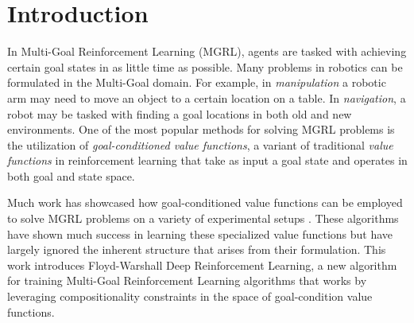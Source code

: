 \section{Introduction}



In Multi-Goal Reinforcement Learning (MGRL)\citep{plappert2018multi}, agents are
tasked with achieving certain goal states in as little time as possible.
Many problems in robotics can be formulated in the Multi-Goal domain. For
example, in \emph{manipulation} a robotic arm may need to move an object
to a certain location on a table. In \emph{navigation}, a robot may be
tasked with finding a goal locations in both old and new environments.  
One of the most popular methods for solving MGRL problems is the
utilization of \emph{goal-conditioned value functions}, a variant of
traditional \emph{value functions} in reinforcement learning that
take as input a goal state and operates in both goal and state space. 


Much work has showcased how goal-conditioned value functions can be
employed to solve MGRL problems on a variety of experimental setups
\citep{sutton2011horde, schaul2015universal,andrychowicz2017hindsight}.
These algorithms have shown much success in learning these specialized
value functions but have largely ignored the inherent structure that
arises from their formulation. This work introduces Floyd-Warshall Deep
Reinforcement Learning, a new algorithm for training Multi-Goal
Reinforcement Learning algorithms that works by leveraging
compositionality constraints in the space of goal-condition value
functions. 


